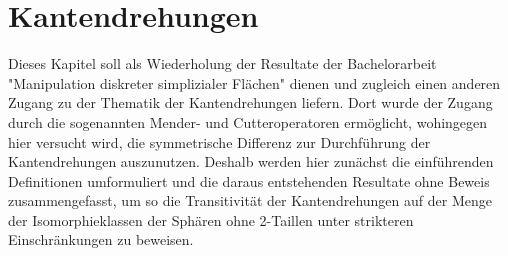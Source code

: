 \documentclass[12pt,titlepage,twoside,cleardoublepage]{article}
\theoremstyle{nummermitklammern}
\numberwithin{equation}{section}
\begin{document}
 \section{Kantendrehungen}\label{edget}
Dieses Kapitel soll als Wiederholung der Resultate der Bachelorarbeit "Manipulation diskreter simplizialer Flächen"  dienen und zugleich einen anderen Zugang zu der Thematik der Kantendrehungen liefern. Dort wurde der Zugang durch die sogenannten Mender- und Cutteroperatoren ermöglicht, wohingegen hier versucht wird, die symmetrische Differenz zur Durchführung der Kantendrehungen auszunutzen. Deshalb werden hier zunächst die einführenden Definitionen umformuliert und die daraus entstehenden Resultate ohne Beweis zusammengefasst, um so die Transitivität der Kantendrehungen auf der Menge der Isomorphieklassen der Sphären ohne 2-Taillen unter strikteren Einschränkungen zu beweisen. 
\end{document}
